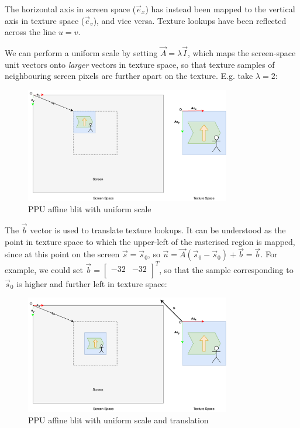 The horizontal axis in screen space ($\vec{e}_x$) has instead been mapped to the vertical axis in texture space ($\vec{e}_v$), and vice versa. Texture lookups have been reflected across the line $u=v$.

We can perform a uniform scale by setting $\vec{A} = \lambda \vec{I}$, which maps the screen-space unit vectors onto {\it larger} vectors in texture space, so that texture samples of neighbouring screen pixels are further apart on the texture. E.g. take $\lambda=2$:

\begin{figure}[H]
\centering
\caption{PPU affine blit with uniform scale}
\label{diagram:ppu_texture_ablit03}
\includegraphics[width=0.8\textwidth]{diagrams/ppu_texture_ablit03.pdf}
\end{figure}

The $\vec{b}$ vector is used to translate texture lookups. It can be understood as the point in texture space to which the upper-left of the rasterised region is mapped, since at this point on the screen $\vec{s} = \vec{s}_0$, so $\vec{u} = \vec{A}(\vec{s}_0 - \vec{s}_0) + \vec{b} = \vec{b}$. For example, we could set $\vec{b} = \begin{bmatrix} -32 & -32 \\ \end{bmatrix}^T$, so that the sample corresponding to $\vec{s}_0$ is higher and further left in texture space:

\begin{figure}[H]
\centering
\caption{PPU affine blit with uniform scale and translation}
\label{diagram:ppu_texture_ablit04}
\includegraphics[width=0.8\textwidth]{diagrams/ppu_texture_ablit04.pdf}
\end{figure}

